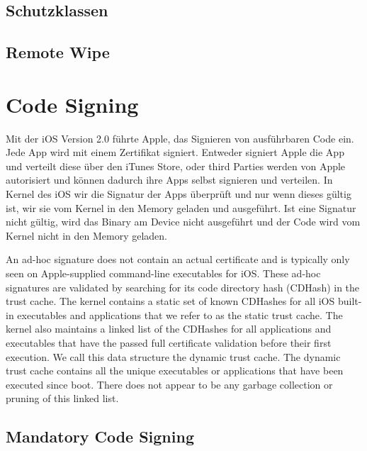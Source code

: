 \subsection{Schutzklassen}
\label{sec:Schutzklassen}

\subsection{Remote Wipe}
\label{sec:RemoteWipe}

\section{Code Signing}
\label{sec:CodeSigning}

Mit der iOS Version 2.0 führte Apple, das Signieren von ausführbaren Code ein. 
Jede App wird mit einem Zertifikat signiert. 
Entweder signiert Apple die App und verteilt diese über den iTunes Store, oder \glqq third Parties\grqq{} werden von Apple autorisiert und können dadurch ihre Apps selbst signieren und verteilen. 
In Kernel des iOS wir die Signatur der Apps überprüft und nur wenn dieses gültig ist, wir sie vom Kernel in den Memory geladen und ausgeführt. 
Ist eine Signatur nicht gültig, wird das Binary am Device nicht ausgeführt und der Code wird vom Kernel nicht in den Memory geladen. 


An ad-hoc signature does not contain an actual certificate and is typically only seen on Apple-supplied command-line executables for iOS. These ad-hoc signatures are validated by searching for its code directory hash (CDHash) in the trust cache. The kernel contains a static set of known CDHashes for all iOS built-in executables and applications that we refer to as the static trust cache. The kernel also maintains a linked list of the CDHashes for all applications and executables that have the passed full certificate validation before their first execution. We call this data structure the dynamic trust cache. The dynamic trust cache contains all the unique executables or applications that have been executed since boot. There does not appear to be any garbage collection or pruning of this linked list. 


\subsection{Mandatory Code Signing}
\label{sec:MandatoryCodeSigning}

